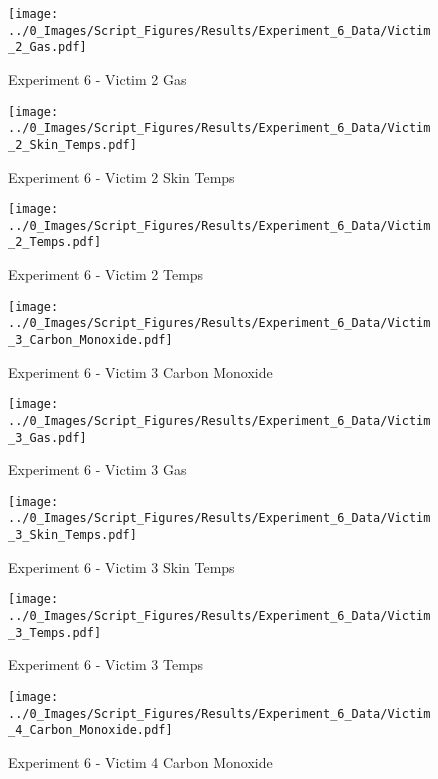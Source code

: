 	\begin{figure}[H]
		\centering
		\texttt{[image: ../0\_Images/Script\_Figures/Results/Experiment\_6\_Data/Victim\_2\_Gas.pdf]}
		\caption[]{Experiment 6 - Victim 2 Gas}
	\end{figure}
 
	\clearpage

	\begin{figure}[H]
		\centering
		\texttt{[image: ../0\_Images/Script\_Figures/Results/Experiment\_6\_Data/Victim\_2\_Skin\_Temps.pdf]}
		\caption[]{Experiment 6 - Victim 2 Skin Temps}
	\end{figure}
 

	\begin{figure}[H]
		\centering
		\texttt{[image: ../0\_Images/Script\_Figures/Results/Experiment\_6\_Data/Victim\_2\_Temps.pdf]}
		\caption[]{Experiment 6 - Victim 2 Temps}
	\end{figure}
 
	\clearpage

	\begin{figure}[H]
		\centering
		\texttt{[image: ../0\_Images/Script\_Figures/Results/Experiment\_6\_Data/Victim\_3\_Carbon\_Monoxide.pdf]}
		\caption[]{Experiment 6 - Victim 3 Carbon Monoxide}
	\end{figure}
 

	\begin{figure}[H]
		\centering
		\texttt{[image: ../0\_Images/Script\_Figures/Results/Experiment\_6\_Data/Victim\_3\_Gas.pdf]}
		\caption[]{Experiment 6 - Victim 3 Gas}
	\end{figure}
 
	\clearpage

	\begin{figure}[H]
		\centering
		\texttt{[image: ../0\_Images/Script\_Figures/Results/Experiment\_6\_Data/Victim\_3\_Skin\_Temps.pdf]}
		\caption[]{Experiment 6 - Victim 3 Skin Temps}
	\end{figure}
 

	\begin{figure}[H]
		\centering
		\texttt{[image: ../0\_Images/Script\_Figures/Results/Experiment\_6\_Data/Victim\_3\_Temps.pdf]}
		\caption[]{Experiment 6 - Victim 3 Temps}
	\end{figure}
 
	\clearpage

	\begin{figure}[H]
		\centering
		\texttt{[image: ../0\_Images/Script\_Figures/Results/Experiment\_6\_Data/Victim\_4\_Carbon\_Monoxide.pdf]}
		\caption[]{Experiment 6 - Victim 4 Carbon Monoxide}
	\end{figure}
 

